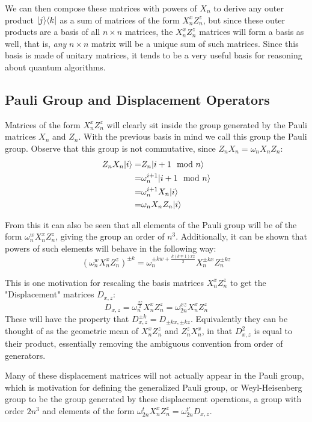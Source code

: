 We can then compose these matrices with powers of $X_n$ to derive any outer product $| j \rangle\langle k |$ as a sum of matrices of the form $X_n^xZ_n^z$, but since these outer products are a basis of all $n\times n$ matrices, the $X_n^xZ_n^z$ matrices will form a basis as well, that is, \textit{any} $n\times n$ matrix will be a unique sum of such matrices. Since this basis is made of unitary matrices, it tends to be a very useful basis for reasoning about quantum algorithms.

\subsection{Pauli Group and Displacement Operators}

Matrices of the form $X_n^xZ_n^z$ will clearly sit inside the group generated by the Pauli matrices $X_n$ and $Z_n$. With the previous basis in mind we call this group the Pauli group. Observe that this group is not commutative, since $Z_nX_n = \omega_nX_nZ_n$:
\begin{align*}
Z_nX_n| i \rangle
=& Z_n| i+1\mod n \rangle
\\=& \omega_n^{i+1}| i+1\mod n \rangle
\\=& \omega_n^{i+1}X_n| i \rangle
\\=& \omega_nX_nZ_n| i \rangle
\end{align*}

From this it can also be seen that all elements of the Pauli group will be of the form $\omega_n^wX_n^xZ_n^z$, giving the group an order of $n^3$. Additionally, it can be shown that powers of such elements will behave in the following way:
\[(\omega_n^wX_n^xZ_n^z)^{\pm k} = \omega_n^{\pm kw+\frac{k(k \mp 1)xz}{2}}X_n^{\pm kx}Z_n^{\pm kz}\]

This is one motivation for rescaling the basis matrices $X_n^xZ_n^z$ to get the "Displacement" matrices $D_{x,z}$:
\[D_{x, z} = \omega_n^{\frac{xz}{2}}X_n^xZ_n^z = \omega_{2n}^{xz}X_n^xZ_n^z\]
These will have the property that $D_{x, z}^{\pm k} = D_{\pm kx, \pm kz}$. Equivalently they can be thought of as the geometric mean of $X_n^xZ_n^z$ and $Z_n^zX_n^x$, in that $D_{x,z}^2$ is equal to their product, essentially removing the ambiguous convention from order of generators.

Many of these displacement matrices will not actually appear in the Pauli group, which is motivation for defining the generalized Pauli group, or Weyl-Heisenberg group to be the group generated by these displacement operations, a group with order $2n^3$ and elements of the form $\omega_{2n}^tX_n^xZ_n^z = \omega_{2n}^{t'}D_{x, z}$.
